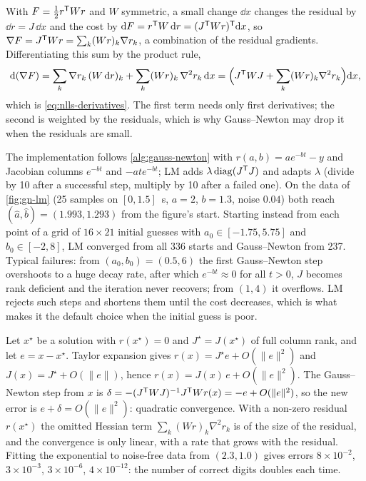 \begin{solutions}
  \item With $F = \tfrac12r^{\mathsf{T}} Wr$ and $W$ symmetric, a small change $\dd x$ changes the residual by $\dd r = J\,\dd x$ and the cost by
        $\mathrm{d} F = r^{\mathsf{T}} W\,\mathrm{d} r = (J^{\mathsf{T}} Wr)^{\mathsf{T}}\mathrm{d} x$, so $\nabla F = J^{\mathsf{T}} Wr = \sum_k(Wr)_k\nabla r_k$, a combination of the residual gradients. Differentiating this sum
        by the product rule,
        \[
          \mathrm{d}(\nabla F) = \sum_k\nabla r_k\,(W\,\mathrm{d} r)_k + \sum_k(Wr)_k\,\nabla^2r_k\,\mathrm{d} x = \Big(J^{\mathsf{T}} WJ + \sum_k(Wr)_k\nabla^2r_k\Big)\mathrm{d} x,
        \]
        which is \eqref{eq:nlls-derivatives}. The first term needs only first derivatives; the second is weighted by the residuals, which is why
        Gauss--Newton may drop it when the residuals are small.

  \item The implementation follows \cref{alg:gauss-newton} with $r(a, b) = ae^{-bt} - y$ and Jacobian columns $e^{-bt}$ and $-ate^{-bt}$; LM adds
        $\lambda\operatorname{diag}(J^{\mathsf{T}} J)$ and adapts $\lambda$ (divide by 10 after a successful step, multiply by 10 after a failed one). On the data of
        \cref{fig:gn-lm} (25 samples on $[0, 1.5]$~s, $a = 2$, $b = 1.3$, noise $0.04$) both reach $(\hat a, \hat b) = (1.993, 1.293)$ from the figure's start.
        Starting instead from each point of a grid of $16\times21$ initial guesses with $a_0 \in [-1.75, 5.75]$ and $b_0 \in [-2, 8]$, LM converged from
        all 336 starts and Gauss--Newton from 237. Typical failures: from $(a_0, b_0) = (0.5, 6)$ the first Gauss--Newton step overshoots to a huge decay
        rate, after which $e^{-bt} \approx 0$ for all $t > 0$, $J$ becomes rank deficient and the iteration never recovers; from $(1, 4)$ it overflows. LM rejects
        such steps and shortens them until the cost decreases, which is what makes it the default choice when the initial guess is poor.

  \item Let $x^\star$ be a solution with $r(x^\star) = 0$ and $J^\star = J(x^\star)$ of full column rank, and let $e = x - x^\star$. Taylor expansion gives
        $r(x) = J^\star e + O(\|e\|^2)$ and $J(x) = J^\star + O(\|e\|)$, hence $r(x) = J(x)\,e + O(\|e\|^2)$. The Gauss--Newton step from $x$ is
        $\delta = -(J^{\mathsf{T}} WJ)^{-1} J^{\mathsf{T}} Wr(x) = -e + O(\|e\|^2)$, so the new error is $e + \delta = O(\|e\|^2)$: quadratic convergence. With a non-zero residual
        $r(x^\star)$ the omitted Hessian term $\sum_k(Wr)_k\nabla^2r_k$ is of the size of the residual, and the convergence is only linear, with a rate that
        grows with the residual. Fitting the exponential to noise-free data from $(2.3, 1.0)$ gives errors $8\times10^{-2}$, $3\times10^{-3}$, $3\times10^{-6}$,
        $4\times10^{-12}$: the number of correct digits doubles each time.


\end{solutions}
